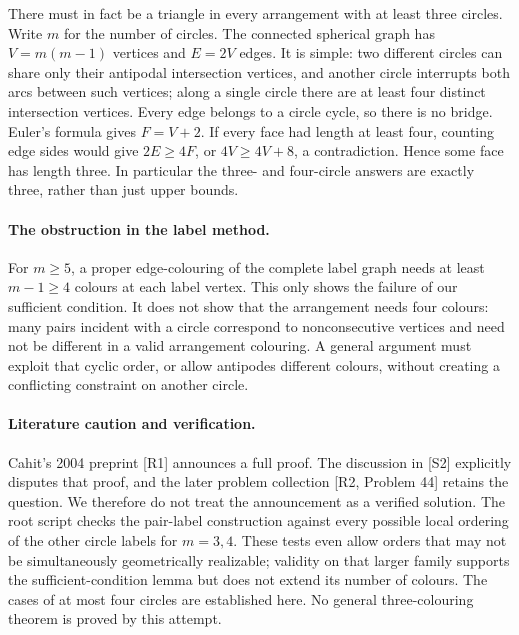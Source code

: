 \documentclass[11pt,a4paper]{article}
\begin{document}
There must in fact be a triangle in every arrangement with at least
three circles. Write $m$ for the number of circles. The connected
spherical graph has $V=m(m-1)$ vertices and $E=2V$ edges. It is
simple: two different circles can share only their antipodal
intersection vertices, and another circle interrupts both arcs
between such vertices; along a single circle there are at least
four distinct intersection vertices. Every edge belongs to a
circle cycle, so there is no bridge. Euler's formula gives $F=V+2$.
If every face had length at least four, counting edge sides would
give $2E\ge4F$, or $4V\ge4V+8$, a contradiction.
Hence some face has length three. In particular the three- and
four-circle answers are exactly three, rather than just upper bounds.

\paragraph{The obstruction in the label method.}
For $m\ge5$, a proper edge-colouring of the complete label graph
needs at least $m-1\ge4$ colours at each label vertex. This only
shows the failure of our sufficient condition. It does not show
that the arrangement needs four colours: many pairs incident with
a circle correspond to nonconsecutive vertices and need not be
different in a valid arrangement colouring. A general argument
must exploit that cyclic order, or allow antipodes different colours,
without creating a conflicting constraint on another circle.

\paragraph{Literature caution and verification.}
Cahit's 2004 preprint [R1] announces a full proof. The discussion in
[S2] explicitly disputes that proof, and the later problem collection
[R2, Problem 44] retains the question. We therefore do not treat the
announcement as a verified solution. The root script checks the
pair-label construction against every possible local ordering of
the other circle labels for $m=3,4$. These tests even allow orders
that may not be simultaneously geometrically realizable; validity
on that larger family supports the sufficient-condition lemma but
does not extend its number of colours.
The cases of at most four circles are established here. No general
three-colouring theorem is proved by this attempt.
\end{document}
